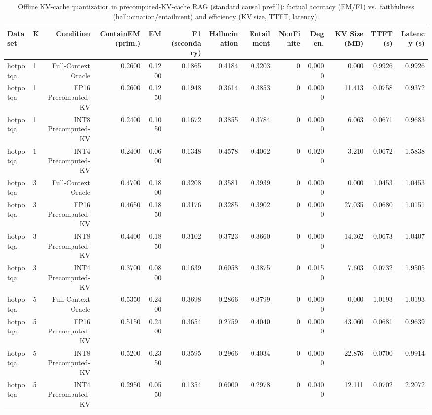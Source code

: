 \begin{table}[t]
\centering
\small
\begin{tabular}{llrrrrrrrrrrr}
\toprule
Dataset & K & Condition & ContainEM (prim.) & EM & F1 (secondary) & Hallucination & Entailment & NonFinite & Degen. & KV Size (MB) & TTFT (s) & Latency (s) \\
\midrule
hotpotqa & 1 & Full-Context Oracle & 0.2600 & 0.1200 & 0.1865 & 0.4184 & 0.3203 & 0 & 0.0000 & 0.000 & 0.9926 & 0.9926 \\
hotpotqa & 1 & FP16 Precomputed-KV & 0.2600 & 0.1250 & 0.1948 & 0.3614 & 0.3853 & 0 & 0.0000 & 11.413 & 0.0758 & 0.9372 \\
hotpotqa & 1 & INT8 Precomputed-KV & 0.2400 & 0.1050 & 0.1672 & 0.3855 & 0.3784 & 0 & 0.0000 & 6.063 & 0.0671 & 0.9683 \\
hotpotqa & 1 & INT4 Precomputed-KV & 0.2400 & 0.0600 & 0.1348 & 0.4578 & 0.4062 & 0 & 0.0200 & 3.210 & 0.0672 & 1.5838 \\
hotpotqa & 3 & Full-Context Oracle & 0.4700 & 0.1800 & 0.3208 & 0.3581 & 0.3939 & 0 & 0.0000 & 0.000 & 1.0453 & 1.0453 \\
hotpotqa & 3 & FP16 Precomputed-KV & 0.4650 & 0.1850 & 0.3176 & 0.3285 & 0.3902 & 0 & 0.0000 & 27.035 & 0.0680 & 1.0151 \\
hotpotqa & 3 & INT8 Precomputed-KV & 0.4400 & 0.1850 & 0.3102 & 0.3723 & 0.3660 & 0 & 0.0000 & 14.362 & 0.0673 & 1.0407 \\
hotpotqa & 3 & INT4 Precomputed-KV & 0.3700 & 0.0800 & 0.1639 & 0.6058 & 0.3875 & 0 & 0.0150 & 7.603 & 0.0732 & 1.9505 \\
hotpotqa & 5 & Full-Context Oracle & 0.5350 & 0.2400 & 0.3698 & 0.2866 & 0.3799 & 0 & 0.0000 & 0.000 & 1.0193 & 1.0193 \\
hotpotqa & 5 & FP16 Precomputed-KV & 0.5150 & 0.2400 & 0.3654 & 0.2759 & 0.4040 & 0 & 0.0000 & 43.060 & 0.0681 & 0.9639 \\
hotpotqa & 5 & INT8 Precomputed-KV & 0.5200 & 0.2350 & 0.3595 & 0.2966 & 0.4034 & 0 & 0.0000 & 22.876 & 0.0700 & 0.9914 \\
hotpotqa & 5 & INT4 Precomputed-KV & 0.2950 & 0.0550 & 0.1354 & 0.6000 & 0.2978 & 0 & 0.0400 & 12.111 & 0.0702 & 2.2072 \\
\bottomrule
\end{tabular}
\caption{Offline KV-cache quantization in precomputed-KV-cache RAG (standard causal prefill): factual accuracy (EM/F1) vs.\ faithfulness (hallucination/entailment) and efficiency (KV size, TTFT, latency).}
\label{tab:main}
\end{table}
